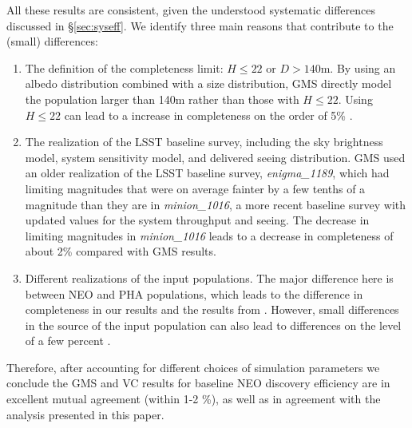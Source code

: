 All these results are consistent, given the understood systematic differences discussed in \S\ref{sec:syseff}. We identify three main reasons that contribute to the (small) differences:
\begin{enumerate}
\item The definition of the completeness limit: $H\le22$ or $D>140$m. By using an albedo distribution combined 
with a size distribution, GMS directly model the population larger than 140m rather than those with $H\le22$. 
Using $H\le22$ can lead to a increase in completeness on the order of 5\% \citep{2016AJ....152...79W, GMS2016}.
\item The realization of the LSST baseline survey, including the sky brightness model, system sensitivity model, and
delivered seeing distribution.  GMS used an older realization of the LSST baseline survey, {\it enigma\_1189}, which
had limiting magnitudes that were on average fainter by a few tenths of a magnitude than they are in 
{\it minion\_1016}, a more recent baseline survey with updated values for the system throughput and seeing. 
The decrease in limiting magnitudes in {\it minion\_1016} leads to a decrease in completeness of about 2\% compared
with GMS results.
\item Different realizations of the input populations. The major difference here is between NEO and PHA populations,
which leads to the difference in completeness in our results and the results from \citet{VeresChesley2017neo}.
However, small differences in the source of the input population can also lead to differences on the level of a few percent \citep{VeresChesley2017neo}. 
\end{enumerate}

Therefore, after accounting for different choices of simulation parameters 
we conclude the GMS and VC results for baseline NEO discovery efficiency are in excellent mutual agreement (within 1-2 \%), as well as in agreement with the analysis presented in this paper.
